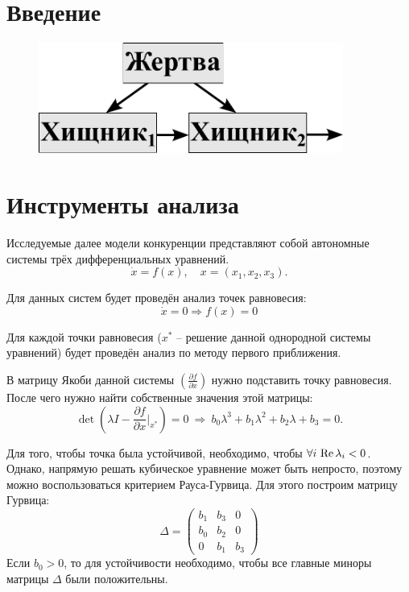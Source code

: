\section{Введение}

    \begin{figure}[H]
        \centering
        \includegraphics[width=10cm]{pictures/scheme.pdf}
    \end{figure}

    
\section{Инструменты анализа}
    Исследуемые далее модели конкуренции представляют собой автономные системы трёх дифференциальных уравнений.
    \[
        \dot{x} = f(x), \quad x = (x_1, x_2, x_3).
    \]

    Для данных систем будет проведён анализ точек равновесия:
    \[
        \dot{x} = 0 \Rightarrow f(x) = 0
    \]

    Для каждой точки равновесия (\( x^* \) -- решение данной однородной системы уравнений) будет проведён анализ по методу первого приближения.

    В матрицу Якоби данной системы \( \left( \frac{\partial f}{\partial x} \right) \) нужно подставить точку равновесия. После чего нужно найти собственные значения этой матрицы:
    \[
        \det \left( \lambda I - \frac{\partial f}{\partial x}\big|_{x^*} \right) = 0 ~ \Rightarrow ~ b_0 \lambda^3 + b_1 \lambda^2 + b_2 \lambda + b_3 = 0.
    \]

    Для того, чтобы точка была устойчивой, необходимо, чтобы \( \forall i \, \operatorname{Re} \lambda_i < 0 \). Однако, напрямую решать кубическое уравнение может быть непросто, поэтому можно воспользоваться критерием Рауса-Гурвица. Для этого построим матрицу Гурвица: 
    \[
        \Delta = \left( \begin{matrix}
            b_1 & b_3 & 0 \\
            b_0 & b_2 & 0 \\
            0   & b_1 & b_3
        \end{matrix} \right)
    \]
    Если \( b_0 > 0\), то для устойчивости необходимо, чтобы все главные миноры матрицы \( \Delta \) были положительны.